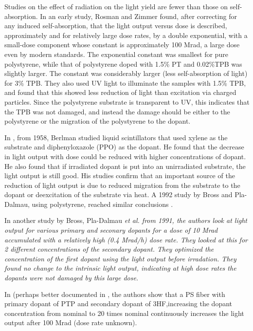 Studies on the effect of radiation on the light yield are fewer
than those on self-absorption.
In an early study, Rosman and Zimmer found, after correcting
for any induced self-absorption, that the light
output versus dose is described,
approximately and for relatively large dose rates, by a double exponential, 
with a small-dose component whose constant is approximately 100 Mrad,
a large dose even by modern standards.
The exponential constant was smallest for pure polystyrene, while
that of polystyrene doped with 1.5\% PT  and 0.02\%TPB
was slightly larger.  The constant was considerably larger (less
self-absorption of light) for 3\% TPB.  They also used UV light to illuminate
the samples with 1.5\% TPB, and found that this showed less
reduction of light than excitation via charged particles.
Since the polystyrene substrate is transparent to UV, this
indicates that the TPB was not damaged, and instead the damage
should be either to the polystyrene or the migration of the polystyrene
to the dopant.

In \cite{berlman}, from 1958, Berlman studied liquid scintillators
that used xylene as the substrate and diphenyloxazole (PPO) as the dopant.
He found that the decrease in light output with dose could be
reduced with higher concentrations of dopant.  He also found
that if irradiated dopant is put into an unirradiated substrate,
the light output is still good.  His studies
confirm that
an important source of the reduction of light output is due to
reduced migration from the substrate 
to the dopant or deexcitation of the substrate via heat.
A 1992 study by Bross and Pla-Dalmau, using polystyrene,
reached similar conclusions \cite{173178}.

In another study by Bross, Pla-Dalmau \it{et al.} from 1991, the authors look at light output for various primary and seconary dopants for a dose of 10 Mrad accumulated with a relatively high (0.4 Mrad/h) dose rate.  They looked at this for 2 different concentrations of the secondary dopant.  They optimized the concentration of the first dopant using the light output before irradation.  They found no change to the intrinsic light output, indicating at high dose rates the dopants were
not damaged by this large dose.  

In \cite{zorn3} (perhaps better documented in \cite{sauli}, the authors show that a PS fiber with primary dopant of PTP and secondary dopant of 3HF,increasing the dopant concentration from nominal to 20 times nominal continuously increases the light output after 100 Mrad (dose rate unknown).

